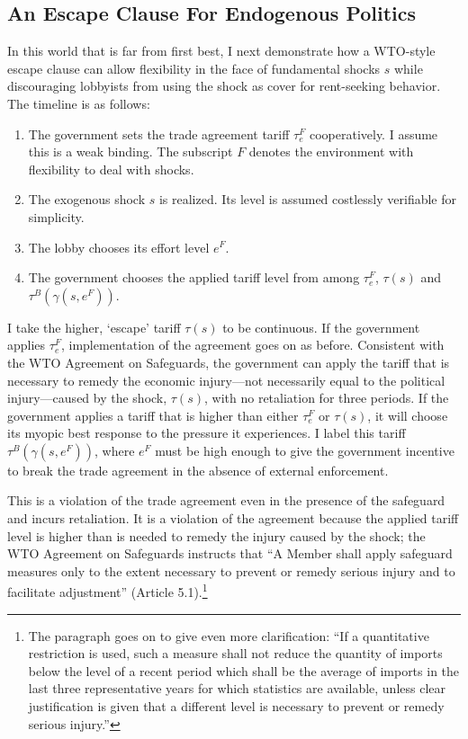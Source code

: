 \documentclass[12pt]{article}
\newcommand{\ga}{\gamma}
\begin{document}
\subsection{An Escape Clause For Endogenous Politics}
\label{sec:ECendog}
In this world that is far from first best, I next demonstrate how a WTO-style escape clause can allow flexibility in the face of fundamental shocks $s$ while discouraging lobbyists from using the shock as cover for rent-seeking behavior. The timeline is as follows:
\begin{enumerate}
	\item The government sets the trade agreement tariff $\tau_e^F$ cooperatively. I assume this is a weak binding. The subscript $F$ denotes the environment with flexibility to deal with shocks.
	\item The exogenous shock $s$ is realized. Its level is assumed costlessly verifiable for simplicity.
	\item The lobby chooses its effort level $e^F$.
	\item The government chooses the applied tariff level from among $\tau_e^F$, $\tau(s)$ and $\tau^B(\ga(s,e^F))$.
\end{enumerate}
I take the higher, `escape' tariff $\tau(s)$ to be continuous. If the government applies $\tau_e^F$, implementation of the agreement goes on as before. Consistent with the WTO Agreement on Safeguards, the government can apply the tariff that is necessary to remedy the economic injury---not necessarily equal to the political injury---caused by the shock, $\tau(s)$, with no retaliation for three periods. If the government applies a tariff that is higher than either $\tau_e^F$ or $\tau(s)$, it will choose its myopic best response to the pressure it experiences. I label this tariff $\tau^B(\ga(s,e^F))$, where $e^F$ must be high enough to give the government incentive to break the trade agreement in the absence of external enforcement.

This is a violation of the trade agreement even in the presence of the safeguard and incurs retaliation. It is a violation of the agreement because the applied tariff level is higher than is needed to remedy the injury caused by the shock; the WTO Agreement on Safeguards instructs that ``A Member shall apply safeguard measures only to the extent necessary to prevent or remedy serious injury and to facilitate adjustment'' (Article 5.1).\footnote{The paragraph goes on to give even more clarification: ``If a quantitative restriction is used, such a measure shall  not reduce the quantity of imports below the level of a recent period which shall be the average of imports in the last three representative years for which statistics are available, unless clear justification is given that a different level is necessary to prevent or remedy serious injury.''}
\end{document}
